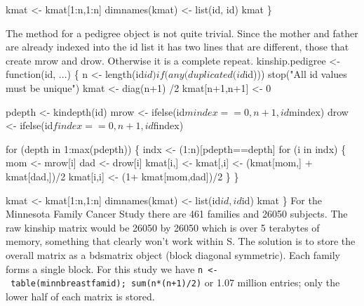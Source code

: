\documentclass{article}
\begin{document}
    kmat <- kmat[1:n,1:n]
    dimnames(kmat) <- list(id, id)
    kmat
    \}
\nwendcode{}\nwdocspar

The method for a pedigree object is not quite trivial.  Since the
mother and father are already indexed into the id list it has 
two lines that are different, those that create mrow and drow.
Otherwise it is a complete repeat.
\nwenddocs{}\plusendmoddef
kinship.pedigree <- function(id, ...) \{
    n <- length(id$id)
    if (any(duplicated(id$id))) stop("All id values must be unique")
    kmat <- diag(n+1) /2
    kmat[n+1,n+1]    <- 0 

    pdepth <- kindepth(id)
    mrow <- ifelse(id$mindex ==0, n+1, id$mindex)
    drow <- ifelse(id$findex ==0, n+1, id$findex)

    for (depth in 1:max(pdepth)) \{
        indx <- (1:n)[pdepth==depth]
        for (i in indx) \{
            mom <- mrow[i]
            dad <- drow[i]
            kmat[i,]  <- kmat[,i] <- (kmat[mom,] + kmat[dad,])/2
            kmat[i,i] <- (1+ kmat[mom,dad])/2
            \}
        \}
    
    kmat <- kmat[1:n,1:n]
    dimnames(kmat) <- list(id$id, id$id)
    kmat
    \}    
\nwendcode{}\nwdocspar
For the Minnesota Family Cancer Study there are 461 families and 26050
subjects.  The raw kinship matrix would be 26050 by 26050 which is over
5 terabytes of memory, something that clearly won't work within S.       %
The solution is to store the overall matrix as a bdsmatrix object (block
diagonal symmetric).  
Each family forms a single block.  For this study we have
{\tt{}n\ <-\ table(minnbreast{}famid);\ sum(n*(n+1)/2)} or 1.07 million entries;
only the lower half of each matrix is stored.
\end{document}
